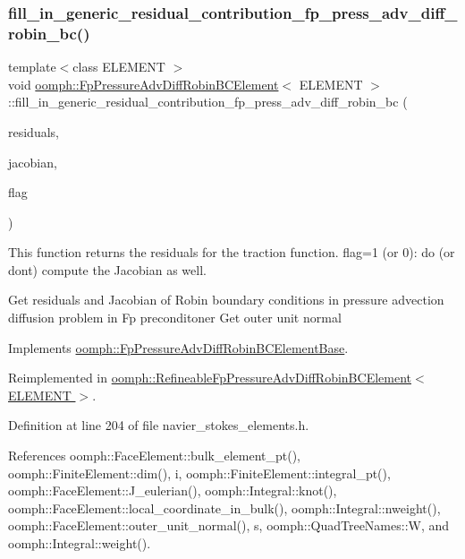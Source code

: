 \subsubsection{\texorpdfstring{fill\+\_\+in\+\_\+generic\+\_\+residual\+\_\+contribution\+\_\+fp\+\_\+press\+\_\+adv\+\_\+diff\+\_\+robin\+\_\+bc()}{fill\_in\_generic\_residual\_contribution\_fp\_press\_adv\_diff\_robin\_bc()}}
{\footnotesize\ttfamily template$<$class E\+L\+E\+M\+E\+NT $>$ \\
void \hyperlink{classoomph_1_1FpPressureAdvDiffRobinBCElement}{oomph\+::\+Fp\+Pressure\+Adv\+Diff\+Robin\+B\+C\+Element}$<$ E\+L\+E\+M\+E\+NT $>$\+::fill\+\_\+in\+\_\+generic\+\_\+residual\+\_\+contribution\+\_\+fp\+\_\+press\+\_\+adv\+\_\+diff\+\_\+robin\+\_\+bc (\begin{DoxyParamCaption}\item[{\hyperlink{classoomph_1_1Vector}{Vector}$<$ double $>$ \&}]{residuals,  }\item[{\hyperlink{classoomph_1_1DenseMatrix}{Dense\+Matrix}$<$ double $>$ \&}]{jacobian,  }\item[{unsigned}]{flag }\end{DoxyParamCaption})\hspace{0.3cm}{\ttfamily [virtual]}}



This function returns the residuals for the traction function. flag=1 (or 0)\+: do (or don\textquotesingle{}t) compute the Jacobian as well. 

Get residuals and Jacobian of Robin boundary conditions in pressure advection diffusion problem in Fp preconditoner Get outer unit normal 

Implements \hyperlink{classoomph_1_1FpPressureAdvDiffRobinBCElementBase_ac6851ef329737b8f9d8cb0e0d9ae15d5}{oomph\+::\+Fp\+Pressure\+Adv\+Diff\+Robin\+B\+C\+Element\+Base}.



Reimplemented in \hyperlink{classoomph_1_1RefineableFpPressureAdvDiffRobinBCElement_ae1c6ebf08fa0aa27847b963cb3bcd581}{oomph\+::\+Refineable\+Fp\+Pressure\+Adv\+Diff\+Robin\+B\+C\+Element$<$ E\+L\+E\+M\+E\+N\+T $>$}.



Definition at line 204 of file navier\+\_\+stokes\+\_\+elements.\+h.



References oomph\+::\+Face\+Element\+::bulk\+\_\+element\+\_\+pt(), oomph\+::\+Finite\+Element\+::dim(), i, oomph\+::\+Finite\+Element\+::integral\+\_\+pt(), oomph\+::\+Face\+Element\+::\+J\+\_\+eulerian(), oomph\+::\+Integral\+::knot(), oomph\+::\+Face\+Element\+::local\+\_\+coordinate\+\_\+in\+\_\+bulk(), oomph\+::\+Integral\+::nweight(), oomph\+::\+Face\+Element\+::outer\+\_\+unit\+\_\+normal(), s, oomph\+::\+Quad\+Tree\+Names\+::W, and oomph\+::\+Integral\+::weight().



